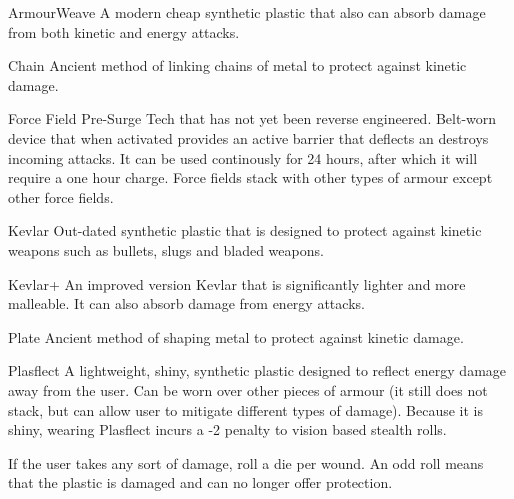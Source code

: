 \begin{multicols}{2}

\begin{genericsection}{ArmourWeave\texttrademark}
A modern cheap synthetic plastic that also can absorb damage from both kinetic and energy attacks.
\end{genericsection}

\begin{genericsection}{Chain}
Ancient method of linking chains of metal to protect against kinetic damage.
\end{genericsection}

\begin{genericsection}{Force Field}
Pre-Surge Tech that has not yet been reverse engineered. Belt-worn device that when activated provides an active barrier that deflects an destroys incoming attacks. It can be used continously for 24 hours, after which it will require a one hour charge. Force fields stack with other types of armour except other force fields.
\end{genericsection}

\begin{genericsection}{Kevlar}
Out-dated synthetic plastic that is designed to protect against kinetic weapons such as bullets, slugs and bladed weapons.
\end{genericsection}

\begin{genericsection}{Kevlar+\texttrademark}
An improved version Kevlar that is significantly lighter and more malleable. It can also absorb damage from energy attacks.
\end{genericsection}

\begin{genericsection}{Plate}
Ancient method of shaping metal to protect against kinetic damage.
\end{genericsection}

\begin{genericsection}{Plasflect\texttrademark }
A lightweight, shiny, synthetic plastic designed to reflect energy damage away from the user. Can be worn over other pieces of armour (it still does not stack, but can allow user to mitigate different types of damage). Because it is shiny, wearing Plasflect incurs a -2 penalty to vision based stealth rolls.

If the user takes any sort of damage, roll a die per wound. An odd roll means that the plastic is damaged and can no longer offer protection.
\end{genericsection}

\end{multicols}

